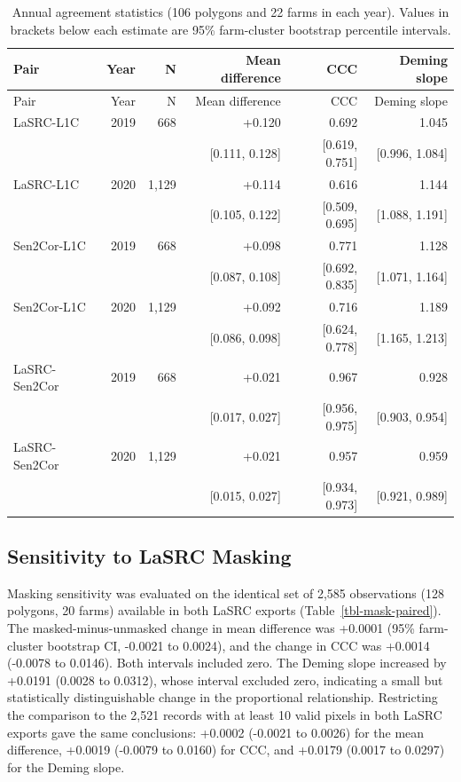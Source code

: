 \documentclass[
  authoryear,
  preprint]{elsarticle}
\begin{document}
\begin{longtable}[]{@{}lrrrrr@{}}
\caption{Annual agreement statistics (106 polygons and 22 farms in each
year). Values in brackets below each estimate are 95\% farm-cluster
bootstrap percentile
intervals.}\label{tbl-agreement-annual}\tabularnewline
\toprule\noalign{}
Pair & Year & N & Mean difference & CCC & Deming slope \\
\midrule\noalign{}
\endfirsthead
\toprule\noalign{}
Pair & Year & N & Mean difference & CCC & Deming slope \\
\midrule\noalign{}
\endhead
\bottomrule\noalign{}
\endlastfoot
LaSRC-L1C & 2019 & 668 & +0.120 & 0.692 & 1.045 \\
& & & {[}0.111, 0.128{]} & {[}0.619, 0.751{]} & {[}0.996, 1.084{]} \\
LaSRC-L1C & 2020 & 1,129 & +0.114 & 0.616 & 1.144 \\
& & & {[}0.105, 0.122{]} & {[}0.509, 0.695{]} & {[}1.088, 1.191{]} \\
Sen2Cor-L1C & 2019 & 668 & +0.098 & 0.771 & 1.128 \\
& & & {[}0.087, 0.108{]} & {[}0.692, 0.835{]} & {[}1.071, 1.164{]} \\
Sen2Cor-L1C & 2020 & 1,129 & +0.092 & 0.716 & 1.189 \\
& & & {[}0.086, 0.098{]} & {[}0.624, 0.778{]} & {[}1.165, 1.213{]} \\
LaSRC-Sen2Cor & 2019 & 668 & +0.021 & 0.967 & 0.928 \\
& & & {[}0.017, 0.027{]} & {[}0.956, 0.975{]} & {[}0.903, 0.954{]} \\
LaSRC-Sen2Cor & 2020 & 1,129 & +0.021 & 0.957 & 0.959 \\
& & & {[}0.015, 0.027{]} & {[}0.934, 0.973{]} & {[}0.921, 0.989{]} \\
\end{longtable}

\subsection{Sensitivity to LaSRC Masking}\label{sec-masking-sensitivity}

Masking sensitivity was evaluated on the identical set of 2,585
observations (128 polygons, 20 farms) available in both LaSRC exports
(Table~\ref{tbl-mask-paired}). The masked-minus-unmasked change in mean
difference was +0.0001 (95\% farm-cluster bootstrap CI, -0.0021 to
0.0024), and the change in CCC was +0.0014 (-0.0078 to 0.0146). Both
intervals included zero. The Deming slope increased by +0.0191 (0.0028
to 0.0312), whose interval excluded zero, indicating a small but
statistically distinguishable change in the proportional relationship.
Restricting the comparison to the 2,521 records with at least 10 valid
pixels in both LaSRC exports gave the same conclusions: +0.0002 (-0.0021
to 0.0026) for the mean difference, +0.0019 (-0.0079 to 0.0160) for CCC,
and +0.0179 (0.0017 to 0.0297) for the Deming slope.
\end{document}
